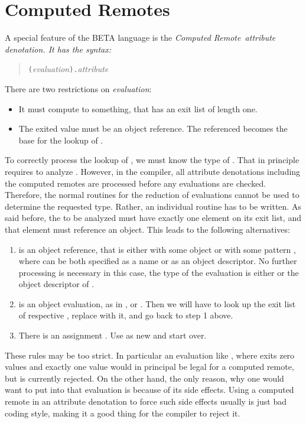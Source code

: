 \section{Computed Remotes}
\label{comprem}
A special feature of the BETA language is the \em Computed Remote\/\em\
attribute denotation.  It has the syntax:
\begin{quote}{\tt (}{\it evaluation\/}{\tt ).}{\it attribute}
\end{quote}
There are two restrictions on {\it evaluation\/}:
\begin{itemize}
\item It must compute to something, that has an exit list of length one.
\item The exited value must be an object reference.  The referenced
    \tq{object} becomes the base for the lookup of .
\end{itemize}
To correctly process the lookup of \tq{attribute}, we must know
the type of .  That in principle requires to analyze
.  However, in the compiler, all attribute
denotations including the computed remotes are processed before
any evaluations are checked.  Therefore, the normal routines for
the reduction of evaluations cannot be used to determine the
requested type.  Rather, an individual routine has to be written.
As said before, the to be analyzed \tq{evaluation} must have
exactly one element on its exit list, and that element must
reference an object.  This leads to the following alternatives:
\begin{enumerate}
\item {} is an object reference, that is either
     with some object \tq{o} or 
    with some pattern \tq{p}, where \tq{p} can be both specified
    as a name or as an object descriptor.  No further processing
    is necessary in this case, the type of the evaluation is
    either  or the object descriptor of .
\item {} is an object evaluation, as in
    ,  or .  Then we will
    have to look up the exit list of \tq{o} respective \tq{p},
    replace  with it, and go back to step 1 above.
\item There is an assignment \cqq{\tq{exp1}->}.
    Use \tq{exp2} as new  and start over.
\end{enumerate}
These rules may be too strict.  In particular an evaluation like
\cqq{(,)}, where \tq{A} exits zero values and \tq{B}
exactly one value would in principal be legal for a computed
remote, but is currently rejected.  On the other hand, the only
reason, why one would want to put  into that evaluation is
because of its side effects.  Using a computed remote in an
attribute denotation to force such side effects usually is just
bad coding style, making it a good thing for the compiler to
reject it.

